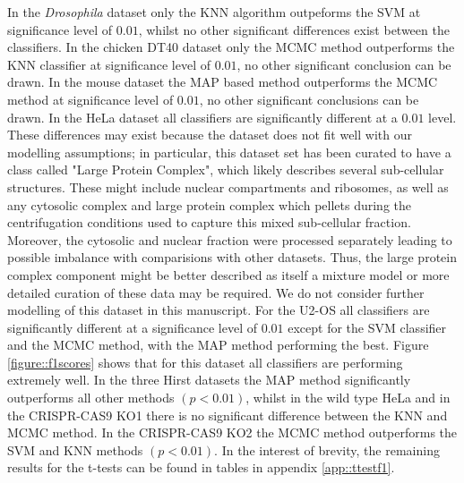 \documentclass[12pt,english]{article}\usepackage[]{graphicx}\usepackage[]{color}
\begin{document}
In the \textit{Drosophila} dataset only the KNN algorithm outpeforms
the SVM at significance level of $0.01$, whilst no other significant
differences exist between the classifiers. In the chicken DT40 dataset
only the MCMC method outperforms the KNN classifier at significance
level of $0.01$, no other significant conclusion can be drawn. In the
mouse dataset the MAP based method outperforms the MCMC method at
significance level of $0.01$, no other significant conclusions can be
drawn. In the HeLa dataset all classifiers are significantly different
at a $0.01$ level. These differences may exist because the dataset does
not fit well with our modelling assumptions; in particular, this
dataset set has been curated to have a class called "Large Protein
Complex", which likely describes several sub-cellular
structures. These might include nuclear compartments and ribosomes, as
well as any cytosolic complex and large protein complex which pellets
during the centrifugation conditions used to capture this mixed
sub-cellular fraction. Moreover, the cytosolic and nuclear fraction
were processed separately leading to possible imbalance with
comparisions with other datasets. Thus, the large protein complex
component might be better described as itself a mixture model or more
detailed curation of these data may be required. We do not consider
further modelling of this dataset in this manuscript. For the U2-OS
all classifiers are significantly different at a significance level of
$0.01$ except for the SVM classifier and the MCMC method, with the MAP
method performing the best. Figure \ref{figure::f1scores} shows that
for this dataset all classifiers are performing extremely well. In the
three Hirst datasets the MAP method significantly outperforms all
other methods $(p < 0.01)$, whilst in the wild type HeLa and in the
CRISPR-CAS9 KO1 there is no significant difference between the KNN
and MCMC method. In the CRISPR-CAS9 KO2 the MCMC method outperforms
the SVM and KNN methods $(p < 0.01)$. In the interest of brevity, the
remaining results for the t-tests can be found in tables in appendix
\ref{app::ttestf1}.
\end{document}
